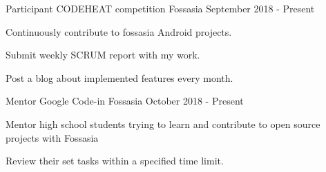 \begin{cventries}
  \cventry
    {Participant}
    {CODEHEAT competition}
    {Fossasia}
    {September 2018 - Present}
    {
      \begin{cvitems}
        \item {Continuously contribute to fossasia Android projects.}
        \item {Submit weekly SCRUM report with my work.}
        \item {Post a blog about implemented features every month.}
      \end{cvitems}
    }
\cventry
    {Mentor}
    {Google Code-in}
    {Fossasia}
    {October 2018 - Present}
    {
      \begin{cvitems}
        \item {Mentor high school students trying to learn and contribute to open source projects with Fossasia}
        \item {Review their set tasks within a specified time limit.}
      \end{cvitems}
    }
\end{cventries}
